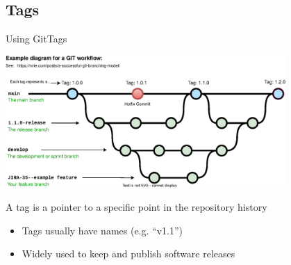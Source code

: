 \documentclass[10pt,compress]{beamer} %
\begin{document}
\subsection{Tags}
\begin{frame}{Using Git}{Tags}

\includegraphics[width=0.8\textwidth]{figs/workflow.eps}

\bigskip

A tag is a pointer to a specific point in the repository history
\begin{itemize}
	\item Tags usually have names (e.g. ``v1.1'')
 \item Widely used to keep and publish software releases
\end{itemize}

\end{frame}






\end{document}
